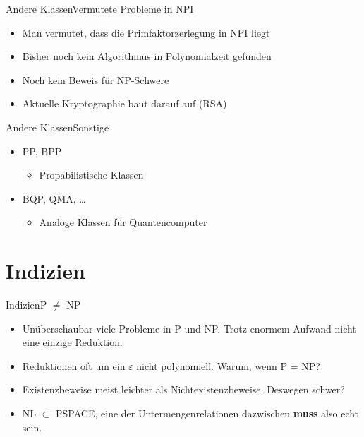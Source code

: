 \documentclass[ignorenonframetext,]{beamer}
\begin{document}
\begin{frame}{Andere Klassen}{Vermutete Probleme in NPI}
\begin{itemize}
\itemsep1pt\parskip0pt
\item
  Man vermutet, dass die Primfaktorzerlegung in NPI liegt
\item
  Bisher noch kein Algorithmus in Polynomialzeit gefunden
\item
  Noch kein Beweis für NP-Schwere
\item
  Aktuelle Kryptographie baut darauf auf (RSA)
\end{itemize}
\end{frame}


\begin{frame}{Andere Klassen}{Sonstige}
\begin{itemize}
	\item PP, BPP
		\begin{itemize}
			\item Propabilistische Klassen
		\end{itemize}
	\item BQP, QMA, \ldots{}
		\begin{itemize}
			\item Analoge Klassen für Quantencomputer
		\end{itemize}
\end{itemize}
\end{frame}


\section{Indizien}\label{indizien}

\begin{frame}{Indizien}{P $\neq$ NP}

\begin{itemize}
\itemsep1pt\parskip0pt
\item
  Unüberschaubar viele Probleme in P und NP. Trotz enormem Aufwand nicht
  eine einzige Reduktion.
\item
  Reduktionen oft um ein $\varepsilon$ nicht polynomiell. Warum, wenn P
  = NP?
\item
  Existenzbeweise meist leichter als Nichtexistenzbeweise. Deswegen
  schwer?
\item
  NL $\subset$ PSPACE, eine der Untermengenrelationen dazwischen
  \textbf{muss} also echt sein.
\end{itemize}

\end{frame}
\end{document}
